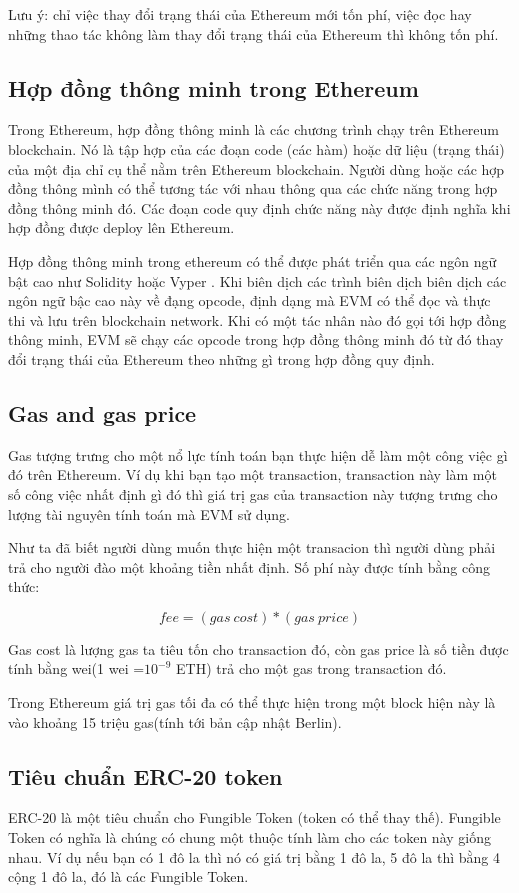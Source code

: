 \documentclass[../thesis.tex]{subfiles}
\begin{document}
Lưu ý: chỉ việc thay đổi trạng thái của Ethereum mới tốn phí, việc đọc hay những thao tác không làm thay đổi trạng thái của Ethereum thì không tốn phí.

\subsection{Hợp đồng thông minh trong Ethereum}
Trong Ethereum, hợp đồng thông minh là các chương trình chạy trên Ethereum blockchain. Nó là tập hợp của các đoạn code (các hàm) hoặc dữ liệu (trạng thái) của một địa chỉ cụ thể nằm trên Ethereum blockchain. Người dùng hoặc các hợp đồng thông mình có thể tương tác với nhau thông qua các chức năng trong hợp đồng thông minh đó. Các đoạn code quy định chức năng này được định nghĩa khi hợp đồng được deploy lên Ethereum.

Hợp đồng thông minh trong ethereum có thể được phát triển qua các ngôn ngữ bật cao như Solidity \cite{solidity} hoặc Vyper \cite{vyper}. Khi biên dịch các trình biên dịch biên dịch các ngôn ngữ bậc cao này về đạng opcode, định dạng mà EVM có thể đọc và thực thi và lưu trên blockchain network. Khi có một tác nhân nào đó gọi tới hợp đồng thông minh, EVM sẽ chạy các opcode trong hợp đồng thông minh đó từ đó thay đổi trạng thái của Ethereum theo những gì trong hợp đồng quy định.

\subsection{Gas and gas price}
Gas tượng trưng cho một nổ lực tính toán bạn thực hiện dễ làm một công việc gì đó trên Ethereum. Ví dụ khi bạn tạo một transaction, transaction này làm một số công việc nhất định gì đó thì giá trị gas của transaction này tượng trưng cho lượng tài nguyên tính toán mà EVM sử dụng.

Như ta đã biết người dùng muốn thực hiện một transacion thì người dùng phải trả cho người đào một khoảng tiền nhất định. Số phí này được tính bằng công thức:

 \[fee = (gas\:cost) * (gas\:price)\]
 
Gas cost là lượng gas ta tiêu tốn cho transaction đó, còn gas price là số tiền được tính bằng wei(1 wei =$10^{-9}$ ETH) trả cho một gas trong transaction đó.

Trong Ethereum giá trị gas tối đa có thể thực hiện trong một block hiện này là vào khoảng 15 triệu gas(tính tới bản cập nhật Berlin).

\subsection{Tiêu chuẩn ERC-20 token}
ERC-20 \cite{ERC20} là một tiêu chuẩn cho Fungible Token (token có thể thay thế). Fungible Token có nghĩa là chúng có chung một thuộc tính làm cho các token này giống nhau. Ví dụ nếu bạn có 1 đô la thì nó có giá trị bằng 1 đô la, 5 đô la thì bằng 4 cộng 1 đô la, đó là các Fungible Token.
\end{document}
